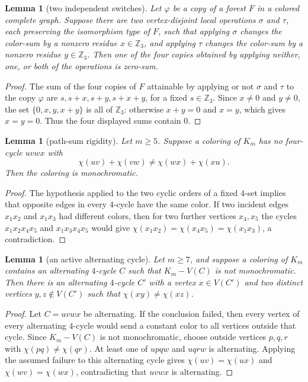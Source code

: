 \documentclass[11pt]{article}
\newtheorem{lemma}[theorem]{Lemma}
\newcommand{\Z}{\mathbb Z}
\begin{document}
\begin{lemma}[two independent switches]\label{lem:two-switches}
Let $\varphi$ be a copy of a forest $F$ in a colored complete graph.  Suppose there are two vertex-disjoint local operations $\sigma$ and $\tau$, each preserving the isomorphism type of $F$, such that applying $\sigma$ changes the color-sum by a nonzero residue $x \in\Z_3$, and applying $\tau$ changes the color-sum by a nonzero residue $y \in\Z_3$.  Then one of the four copies obtained by applying neither, one, or both of the operations is zero-sum.
\end{lemma}

\begin{proof}
The sum of the four copies of $F$ attainable by applying or not $\sigma$ and $\tau$ to the copy $\varphi$ are $s,s+x,s+y,s+x+y$, for a fixed $s\in\Z_3$.  Since $x\ne 0$ and $y\ne 0$, the set $\{0,x,y,x+y\}$ is all of $\Z_3$: otherwise $x+y=0$ and $x=y$, which gives $x=y=0$.  Thus the four displayed sums contain $0$.
\end{proof}

\begin{lemma}[path-sum rigidity]\label{lem:path-sum-rigid}
Let $m\ge5$.  Suppose a coloring of $K_m$ has no four-cycle $uvwx$ with
\[
        \chi(uv)+\chi(vw)\ne \chi(wx)+\chi(xu).
\]
Then the coloring is monochromatic.
\end{lemma}

\begin{proof}
The hypothesis applied to the two cyclic orders of a fixed $4$-set implies that opposite edges in every $4$-cycle have the same color.  If two incident edges $x_1x_2$ and $x_1x_3$ had different colors, then for two further vertices $x_4,x_5$ the cycles $x_1x_2x_4x_5$ and $x_1x_3x_4x_5$ would give
$\chi(x_1x_2)=\chi(x_4x_5)=\chi(x_1x_3)$, a contradiction.
\end{proof}


\begin{lemma}[an active alternating cycle]\label{lem:active-cycle}
Let $m\ge7$, and suppose a coloring of $K_m$ contains an alternating $4$-cycle $C$ such that $K_m-V(C)$ is not monochromatic.  Then there is an alternating $4$-cycle $C'$ with a vertex $x\in V(C')$ and two distinct vertices $y,z\notin V(C')$ such that $\chi(xy)\ne\chi(xz)$.
\end{lemma}

\begin{proof}
Let $C=uvwx$ be alternating.  If the conclusion failed, then every vertex of every alternating $4$-cycle would send a constant color to all vertices outside that cycle.  Since $K_m-V(C)$ is not monochromatic, choose outside vertices $p,q,r$ with $\chi(pq)\ne\chi(qr)$.  At least one of $upqw$ and $uqrw$ is alternating.  Applying the assumed failure to this alternating cycle gives $\chi(uv)=\chi(ux)$ and $\chi(wv)=\chi(wx)$, contradicting that $uvwx$ is alternating.
\end{proof}
\end{document}
